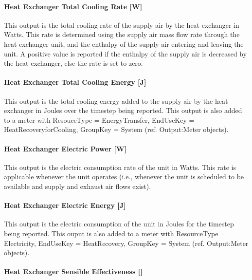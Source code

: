 \paragraph{Heat Exchanger Total Cooling Rate {[}W{]}}\label{heat-exchanger-total-cooling-rate-w-1}

This output is the total cooling rate of the supply air by the heat exchanger in Watts. This rate is determined using the supply air mass flow rate through the heat exchanger unit, and the enthalpy of the supply air entering and leaving the unit. A positive value is reported if the enthalpy of the supply air is decreased by the heat exchanger, else the rate is set to zero.

\paragraph{Heat Exchanger Total Cooling Energy {[}J{]}}\label{heat-exchanger-total-cooling-energy-j-1}

This output is the total cooling energy added to the supply air by the heat exchanger in Joules over the timestep being reported. This output is also added to a meter with ResouceType = EnergyTransfer, EndUseKey = HeatRecoveryforCooling, GroupKey = System (ref. Output:Meter objects).

\paragraph{Heat Exchanger Electric Power {[}W{]}}\label{heat-exchanger-electric-power-w-1}

This output is the electric consumption rate of the unit in Watts. This rate is applicable whenever the unit operates (i.e., whenever the unit is scheduled to be available and supply and exhaust air flows exist).

\paragraph{Heat Exchanger Electric Energy {[}J{]}}\label{heat-exchanger-electric-energy-j-1}

This output is the electric consumption of the unit in Joules for the timestep being reported. This ouput is also added to a meter with ResourceType = Electricity, EndUseKey = HeatRecovery, GroupKey = System (ref. Output:Meter objects).

\paragraph{Heat Exchanger Sensible Effectiveness {[]}}\label{heat-exchanger-sensible-effectiveness}

